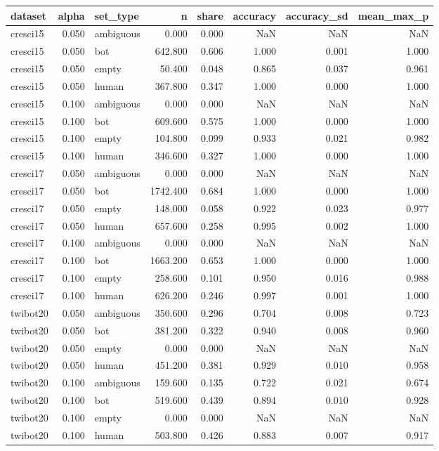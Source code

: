 \begin{tabular}{lrlrrrrr}
\toprule
dataset & alpha & set_type & n & share & accuracy & accuracy_sd & mean_max_p \\
\midrule
cresci15 & 0.050 & ambiguous & 0.000 & 0.000 & NaN & NaN & NaN \\
cresci15 & 0.050 & bot & 642.800 & 0.606 & 1.000 & 0.001 & 1.000 \\
cresci15 & 0.050 & empty & 50.400 & 0.048 & 0.865 & 0.037 & 0.961 \\
cresci15 & 0.050 & human & 367.800 & 0.347 & 1.000 & 0.000 & 1.000 \\
cresci15 & 0.100 & ambiguous & 0.000 & 0.000 & NaN & NaN & NaN \\
cresci15 & 0.100 & bot & 609.600 & 0.575 & 1.000 & 0.000 & 1.000 \\
cresci15 & 0.100 & empty & 104.800 & 0.099 & 0.933 & 0.021 & 0.982 \\
cresci15 & 0.100 & human & 346.600 & 0.327 & 1.000 & 0.000 & 1.000 \\
cresci17 & 0.050 & ambiguous & 0.000 & 0.000 & NaN & NaN & NaN \\
cresci17 & 0.050 & bot & 1742.400 & 0.684 & 1.000 & 0.000 & 1.000 \\
cresci17 & 0.050 & empty & 148.000 & 0.058 & 0.922 & 0.023 & 0.977 \\
cresci17 & 0.050 & human & 657.600 & 0.258 & 0.995 & 0.002 & 1.000 \\
cresci17 & 0.100 & ambiguous & 0.000 & 0.000 & NaN & NaN & NaN \\
cresci17 & 0.100 & bot & 1663.200 & 0.653 & 1.000 & 0.000 & 1.000 \\
cresci17 & 0.100 & empty & 258.600 & 0.101 & 0.950 & 0.016 & 0.988 \\
cresci17 & 0.100 & human & 626.200 & 0.246 & 0.997 & 0.001 & 1.000 \\
twibot20 & 0.050 & ambiguous & 350.600 & 0.296 & 0.704 & 0.008 & 0.723 \\
twibot20 & 0.050 & bot & 381.200 & 0.322 & 0.940 & 0.008 & 0.960 \\
twibot20 & 0.050 & empty & 0.000 & 0.000 & NaN & NaN & NaN \\
twibot20 & 0.050 & human & 451.200 & 0.381 & 0.929 & 0.010 & 0.958 \\
twibot20 & 0.100 & ambiguous & 159.600 & 0.135 & 0.722 & 0.021 & 0.674 \\
twibot20 & 0.100 & bot & 519.600 & 0.439 & 0.894 & 0.010 & 0.928 \\
twibot20 & 0.100 & empty & 0.000 & 0.000 & NaN & NaN & NaN \\
twibot20 & 0.100 & human & 503.800 & 0.426 & 0.883 & 0.007 & 0.917 \\
\bottomrule
\end{tabular}
